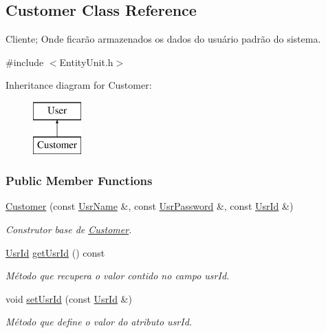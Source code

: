 \hypertarget{classCustomer}{\subsection{Customer Class Reference}
\label{d9/d12/classCustomer}
}


Cliente; Onde ficarão armazenados os dados do usuário padrão do sistema.  




{\ttfamily \#include $<$Entity\-Unit.\-h$>$}

Inheritance diagram for Customer\-:\begin{figure}[H]
\begin{center}
\leavevmode
\includegraphics[height=2.000000cm]{d9/d12/classCustomer}
\end{center}
\end{figure}
\subsubsection*{Public Member Functions}
\begin{DoxyCompactItemize}
\item 
\hyperlink{classCustomer_a3f3be282d21b234e1e72f645d8fdc362}{Customer} (const \hyperlink{classUsrName}{Usr\-Name} \&, const \hyperlink{classUsrPassword}{Usr\-Password} \&, const \hyperlink{classUsrId}{Usr\-Id} \&)
\begin{DoxyCompactList}\small\item\em Construtor base de \hyperlink{classCustomer}{Customer}. \end{DoxyCompactList}\item 
\hyperlink{classUsrId}{Usr\-Id} \hyperlink{classCustomer_a76d325591ef27599cb1d7f3e4b77b8d4}{get\-Usr\-Id} () const 
\begin{DoxyCompactList}\small\item\em Método que recupera o valor contido no campo usr\-Id. \end{DoxyCompactList}\item 
void \hyperlink{classCustomer_a89b74269a4750193d61b305b13df82fa}{set\-Usr\-Id} (const \hyperlink{classUsrId}{Usr\-Id} \&)
\begin{DoxyCompactList}\small\item\em Método que define o valor do atributo usr\-Id. \end{DoxyCompactList}\end{DoxyCompactItemize}
